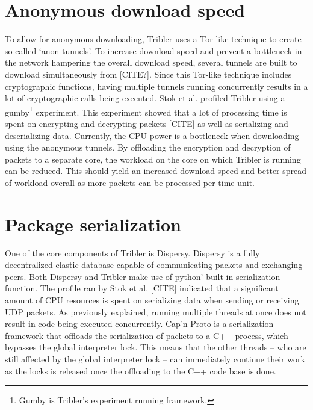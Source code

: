 \section{Anonymous download speed}
To allow for anonymous downloading, Tribler uses a Tor-like technique to create so called `anon tunnels'.
To increase download speed and prevent a bottleneck in the network hampering the overall download speed, several tunnels are built to download simultaneously from [CITE?].
Since this Tor-like technique includes cryptographic functions, having multiple tunnels running concurrently results in a lot of cryptographic calls being executed.
Stok et al. profiled Tribler using a gumby\footnote{Gumby is Tribler's experiment running framework.} experiment. This experiment showed that a lot of processing time is spent on encrypting and decrypting packets [CITE] as well as serializing and deserializing data.
Currently, the CPU power is a bottleneck when downloading using the anonymous tunnels.
By offloading the encryption and decryption of packets to a separate core, the workload on the core on which Tribler is running can be reduced.
This should yield an increased download speed and better spread of workload overall as more packets can be processed per time unit.

\section{Package serialization}
One of the core components of Tribler is Dispersy. 
Dispersy is a fully decentralized elastic database capable of communicating packets and exchanging peers.
Both Dispersy and Tribler make use of python' built-in serialization function.
The profile ran by Stok et al. [CITE] indicated that a significant amount of CPU resources is spent on serializing data when sending or receiving UDP packets.
As previously explained, running multiple threads at once does not result in code being executed concurrently.
Cap'n Proto is a serialization framework that offloads the serialization of packets to a C++ process, which bypasses the global interpreter lock.
This means that the other threads -- who are still affected by the global interpreter lock -- can immediately continue their work as the locks is released once the offloading to the C++ code base is done.


